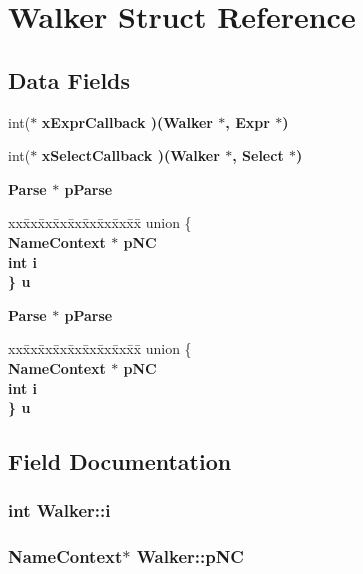 \section{Walker Struct Reference}
\label{structWalker}
\subsection*{Data Fields}
\begin{CompactItemize}
\item 
int($\ast$ \bf{x\-Expr\-Callback} )(\bf{Walker} $\ast$, \bf{Expr} $\ast$)
\item 
int($\ast$ \bf{x\-Select\-Callback} )(\bf{Walker} $\ast$, \bf{Select} $\ast$)
\item 
\bf{Parse} $\ast$ \bf{p\-Parse}
\item 
\begin{tabbing}
xx\=xx\=xx\=xx\=xx\=xx\=xx\=xx\=xx\=\kill
union \{\\
\>\bf{NameContext} $\ast$ \bf{pNC}\\
\>int \bf{i}\\
\} \bf{u}\\

\end{tabbing}\item 
\bf{Parse} $\ast$ \bf{p\-Parse}
\item 
\begin{tabbing}
xx\=xx\=xx\=xx\=xx\=xx\=xx\=xx\=xx\=\kill
union \{\\
\>\bf{NameContext} $\ast$ \bf{pNC}\\
\>int \bf{i}\\
\} \bf{u}\\

\end{tabbing}\end{CompactItemize}


\subsection{Field Documentation}
\subsubsection{\setlength{\rightskip}{0pt plus 5cm}int \bf{Walker::i}}\label{structWalker_0075fc21a272738a396b6c94e164b0c4}


\subsubsection{\setlength{\rightskip}{0pt plus 5cm}\bf{Name\-Context}$\ast$ \bf{Walker::p\-NC}}\label{structWalker_2587d687b9d866c2085d717fa1270107}


